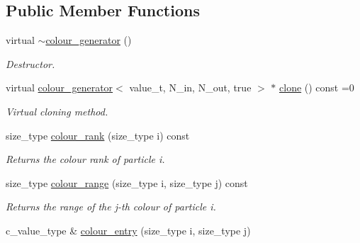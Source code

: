 \subsection*{Public Member Functions}
\begin{DoxyCompactItemize}
\item 
\hypertarget{a00079_a5a22c6908b2c697886974a0feecedfdc}{}virtual \hyperlink{a00079_a5a22c6908b2c697886974a0feecedfdc}{$\sim$colour\+\_\+generator} ()\label{a00079_a5a22c6908b2c697886974a0feecedfdc}

\begin{DoxyCompactList}\small\item\em Destructor. \end{DoxyCompactList}\item 
\hypertarget{a00079_aac467bb578b7dcf03af0fcc266e2e30e}{}virtual \hyperlink{a00077}{colour\+\_\+generator}$<$ value\+\_\+t, N\+\_\+in, N\+\_\+out, true $>$ $\ast$ \hyperlink{a00079_aac467bb578b7dcf03af0fcc266e2e30e}{clone} () const =0\label{a00079_aac467bb578b7dcf03af0fcc266e2e30e}

\begin{DoxyCompactList}\small\item\em Virtual cloning method. \end{DoxyCompactList}\item 
\hypertarget{a00079_a61583f8635cb79942a325cf35a18ad93}{}size\+\_\+type \hyperlink{a00079_a61583f8635cb79942a325cf35a18ad93}{colour\+\_\+rank} (size\+\_\+type i) const \label{a00079_a61583f8635cb79942a325cf35a18ad93}

\begin{DoxyCompactList}\small\item\em Returns the colour rank of particle i. \end{DoxyCompactList}\item 
\hypertarget{a00079_add07070a70fe7c835333065ffc19ca8d}{}size\+\_\+type \hyperlink{a00079_add07070a70fe7c835333065ffc19ca8d}{colour\+\_\+range} (size\+\_\+type i, size\+\_\+type j) const \label{a00079_add07070a70fe7c835333065ffc19ca8d}

\begin{DoxyCompactList}\small\item\em Returns the range of the j-\/th colour of particle i. \end{DoxyCompactList}\item 
\hypertarget{a00079_a919520e8427003cf13e84daf4de11212}{}c\+\_\+value\+\_\+type \& \hyperlink{a00079_a919520e8427003cf13e84daf4de11212}{colour\+\_\+entry} (size\+\_\+type i, size\+\_\+type j)\label{a00079_a919520e8427003cf13e84daf4de11212}


\end{DoxyCompactItemize}

